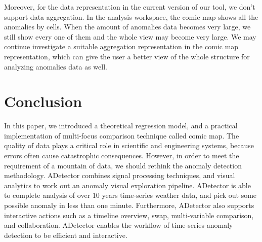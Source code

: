 \documentclass{vgtc}                          %
\begin{document}
Moreover, for the data representation in the current version of our tool, we don't support data aggregation. In the analysis workspace, the comic map shows all the anomalies by cells. When the amount of anomalies data becomes very large, we still show every one of them and the whole view may become very large. We may continue investigate a suitable aggregation representation in the comic map representation, which can give the user a better view of the whole structure for analyzing anomalies data as well.

\section{Conclusion}
In this paper, we introduced a theoretical regression model, and a practical implementation of multi-focus comparison technique called comic map. The quality of data plays a critical role in scientific and engineering systems, because errors often cause catastrophic consequences. However, in order to meet the requirement of a mountain of data, we should rethink the anomaly detection methodology. ADetector combines signal processing techniques, and visual analytics to work out an anomaly visual exploration pipeline. ADetector is able to complete analysis of over 10 years time-series weather data, and pick out some possible anomaly in less than one minute. Furthermore, ADetector also supports interactive actions such as a timeline overview, swap, multi-variable comparison, and collaboration. ADetector enables the workflow of time-series anomaly detection to be efficient and interactive.





\end{document}
